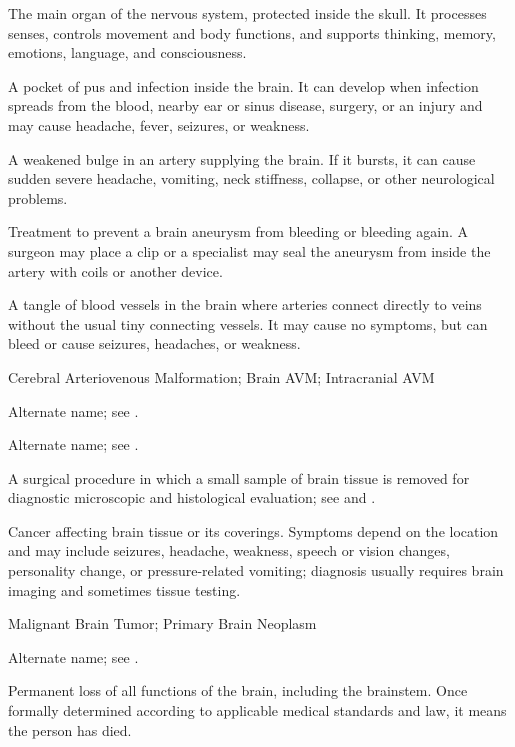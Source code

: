  The main organ of the nervous system, protected inside the skull. It processes senses, controls movement and body functions, and supports thinking, memory, emotions, language, and consciousness.

 A pocket of pus and infection inside the brain. It can develop when infection spreads from the blood, nearby ear or sinus disease, surgery, or an injury and may cause headache, fever, seizures, or weakness.

 A weakened bulge in an artery supplying the brain. If it bursts, it can cause sudden severe headache, vomiting, neck stiffness, collapse, or other neurological problems.

 Treatment to prevent a brain aneurysm from bleeding or bleeding again. A surgeon may place a clip or a specialist may seal the aneurysm from inside the artery with coils or another device.

 A tangle of blood vessels in the brain where arteries connect directly to veins without the usual tiny connecting vessels. It may cause no symptoms, but can bleed or cause seizures, headaches, or weakness.

\synonyms
Cerebral Arteriovenous Malformation; Brain AVM; Intracranial AVM

 Alternate name; see .

 Alternate name; see .

 A surgical procedure in which a small sample of brain tissue is removed for diagnostic microscopic and histological evaluation; see  and .

 Cancer affecting brain tissue or its coverings. Symptoms depend on the location and may include seizures, headache, weakness, speech or vision changes, personality change, or pressure-related vomiting; diagnosis usually requires brain imaging and sometimes tissue testing.

\synonyms
Malignant Brain Tumor; Primary Brain Neoplasm

 Alternate name; see .

 Permanent loss of all functions of the brain, including the brainstem. Once formally determined according to applicable medical standards and law, it means the person has died.

